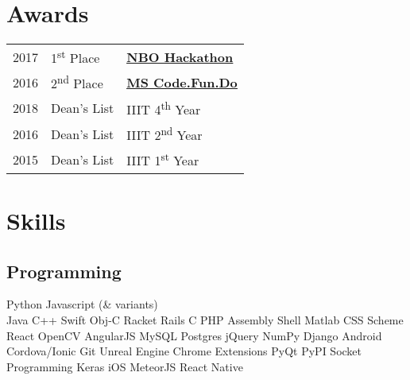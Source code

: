 \documentclass[]{deedy-resume-openfont}
\begin{document}
\begin{minipage}[t]{0.33\textwidth}
\section{Awards} 
\begin{tabular}{@{}lll}
2017	     & 1\textsuperscript{st} Place  & \textbf{\underline{\href{https://www.nbo.om/en/Pages/Competitions/NBO-Hackathon.aspx}{NBO Hackathon}}}\\
2016	     & 2\textsuperscript{nd} Place & \textbf{\underline{\href{https://www.acadaccelerator.com/}{MS Code.Fun.Do}}}\\
2018         & Dean's List  & IIIT 4\textsuperscript{th} Year\\
2016	     & Dean's List  & IIIT 2\textsuperscript{nd} Year\\
2015	     & Dean's List  & IIIT 1\textsuperscript{st} Year\\

\end{tabular}
\sectionsep


\section{Skills}
\subsection{Programming}
 Python \textbullet{} Javascript (\& variants) \\
Java \textbullet{} C++
\textbullet{} Swift 
\textbullet{} Obj-C
 \textbullet{} Racket \textbullet{} Rails \textbullet{} C \textbullet{} PHP \textbullet{} Assembly  \textbullet{} Shell \textbullet{} Matlab \textbullet{} CSS
\textbullet{} Scheme   \\
React \textbullet{} OpenCV \textbullet{} AngularJS \textbullet{} MySQL \textbullet{} Postgres \textbullet jQuery \textbullet{} NumPy \textbullet{} Django \textbullet{} Android
\textbullet{} Cordova/Ionic \textbullet{} Git \textbullet{} Unreal Engine
\textbullet{} Chrome Extensions \textbullet{} PyQt \textbullet{} PyPI \textbullet{} Socket Programming \textbullet{} Keras \textbullet{} iOS \textbullet{} MeteorJS \textbullet{} React Native
\sectionsep



\end{minipage}
\end{document}
